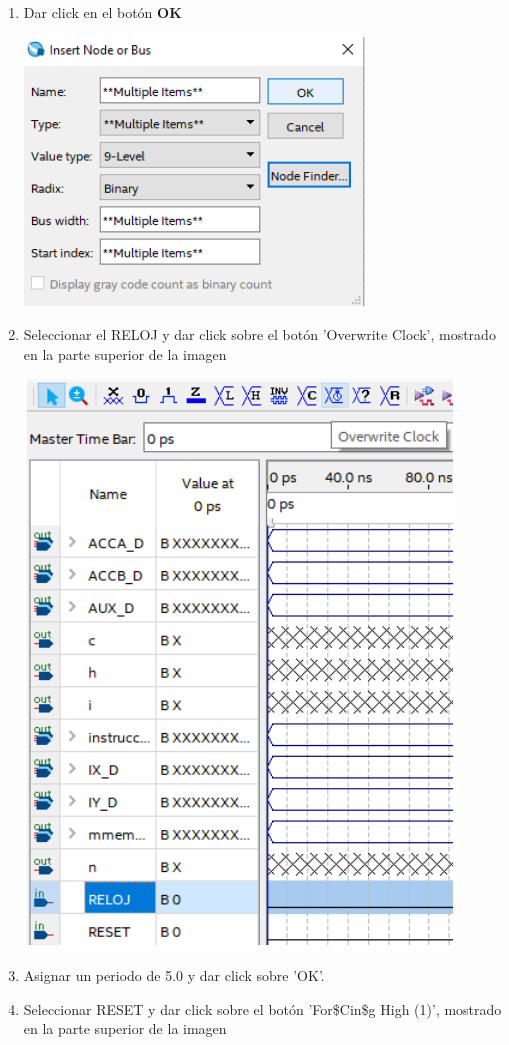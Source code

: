 \documentclass{IEEEtran}
\begin{document}
\begin{enumerate}
\item Dar click en el botón \textbf{OK}
\begin{center}
\includegraphics[width=0.6\linewidth]{./img/sim5.png}
\end{center}
\item Seleccionar el RELOJ y dar click sobre el botón 'Overwrite Clock', mostrado en la parte superior de la imagen
\begin{center}
\includegraphics[width=0.6\linewidth]{./img/sim6.png}
\end{center}
\item Asignar un periodo de 5.0 y dar click sobre 'OK'.
\item Seleccionar RESET y dar click sobre el botón 'For\$Cin\$g High (1)', mostrado en la parte superior de la imagen
\begin{center}

\end{center}
\end{enumerate}
\end{document}
